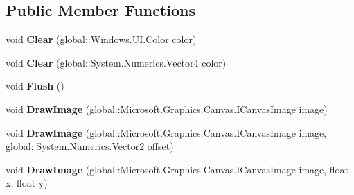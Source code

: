 \subsection*{Public Member Functions}
\begin{DoxyCompactItemize}
\item 
\mbox{\label{interface_microsoft_1_1_graphics_1_1_canvas_1_1_i_canvas_drawing_session_a0f2129c914d633adc0d37c1f19dbbbff}} 
void {\bfseries Clear} (global\+::\+Windows.\+U\+I.\+Color color)
\item 
\mbox{\label{interface_microsoft_1_1_graphics_1_1_canvas_1_1_i_canvas_drawing_session_aca64e0841e7be8e14ef4bb099cb7a66a}} 
void {\bfseries Clear} (global\+::\+System.\+Numerics.\+Vector4 color)
\item 
\mbox{\label{interface_microsoft_1_1_graphics_1_1_canvas_1_1_i_canvas_drawing_session_a8ff1e3b4f084927a7d1387bb52efc41a}} 
void {\bfseries Flush} ()
\item 
\mbox{\label{interface_microsoft_1_1_graphics_1_1_canvas_1_1_i_canvas_drawing_session_ac1f4a3bd5849df08e07c05756ad7137a}} 
void {\bfseries Draw\+Image} (global\+::\+Microsoft.\+Graphics.\+Canvas.\+I\+Canvas\+Image image)
\item 
\mbox{\label{interface_microsoft_1_1_graphics_1_1_canvas_1_1_i_canvas_drawing_session_a7b45233377b9145c9ca991b8c65eb2a3}} 
void {\bfseries Draw\+Image} (global\+::\+Microsoft.\+Graphics.\+Canvas.\+I\+Canvas\+Image image, global\+::\+System.\+Numerics.\+Vector2 offset)
\item 
\mbox{\label{interface_microsoft_1_1_graphics_1_1_canvas_1_1_i_canvas_drawing_session_a00025470cb4a49490028c8a0f99be07b}} 
void {\bfseries Draw\+Image} (global\+::\+Microsoft.\+Graphics.\+Canvas.\+I\+Canvas\+Image image, float x, float y)
\item 
\mbox{\label{interface_microsoft_1_1_graphics_1_1_canvas_1_1_i_canvas_drawing_session_a217624e9b6fad3572752f97968e22579}} 

\end{DoxyCompactItemize}
